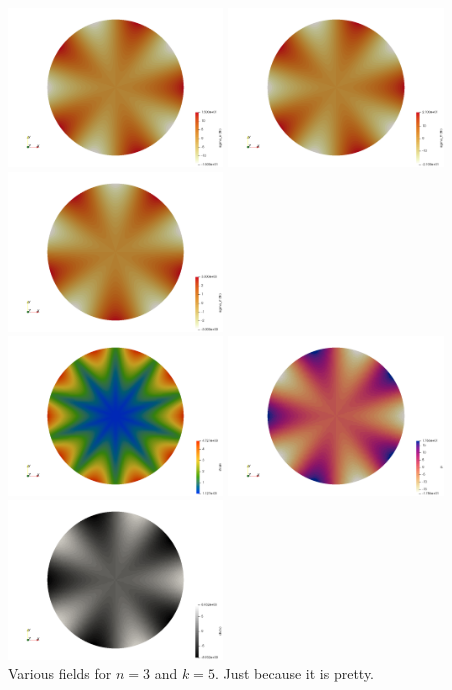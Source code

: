 \begin{center}
\includegraphics[width=5.7cm]{python_codes/fieldstone_111/results/n3_k5/sigma_rr}
\includegraphics[width=5.7cm]{python_codes/fieldstone_111/results/n3_k5/sigma_tt}
\includegraphics[width=5.7cm]{python_codes/fieldstone_111/results/n3_k5/sigma_rt}\\
\includegraphics[width=5.7cm]{python_codes/fieldstone_111/results/n3_k5/e}
\includegraphics[width=5.7cm]{python_codes/fieldstone_111/results/n3_k5/press}
\includegraphics[width=5.7cm]{python_codes/fieldstone_111/results/n3_k5/divv}\\
{\captionfont Various fields for $n=3$ and $k=5$. Just because it is pretty.}
\end{center}


